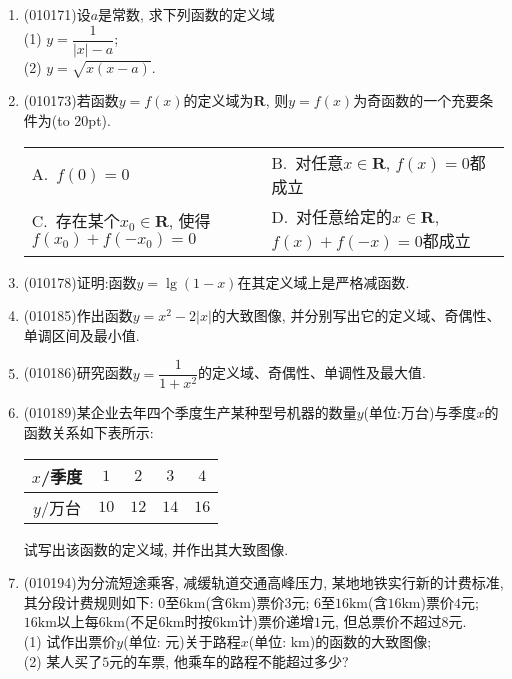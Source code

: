 \documentclass[10pt,a4paper]{article}
\newcommand{\bracket}[1]{(\hbox to #1pt{})}
\newcommand{\twoch}[4]{\par\begin{tabular}{p{.46\textwidth}p{.46\textwidth}}
A.~#1& B.~#2\\
C.~#3& D.~#4
\end{tabular}}
\begin{document}
\begin{enumerate}[1.]
\begin{center}
\end{center}
\item {\tiny (010171)}设$a$是常数, 求下列函数的定义域\\
(1) $y=\dfrac1{|x|-a}$;\\
(2) $y=\sqrt{x(x-a)}$.
\item {\tiny (010173)}若函数$y=f(x)$的定义域为$\mathbf{R}$, 则$y=f(x)$为奇函数的一个充要条件为\bracket{20}.
\twoch{$f(0)=0$}{对任意$x\in \mathbf{R}$, $f(x)=0$都成立}{存在某个$x_0\in \mathbf{R}$, 使得$f(x_0)+f(-x_0)=0$}{对任意给定的$x\in \mathbf{R}$, $f(x)+f(-x)=0$都成立}
\item {\tiny (010178)}证明:函数$y=\lg (1-x)$在其定义域上是严格减函数.
\item {\tiny (010185)}作出函数$y=x^2-2|x|$的大致图像, 并分别写出它的定义域、奇偶性、单调区间及最小值.
\item {\tiny (010186)}研究函数$y=\dfrac1{1+x^2}$的定义域、奇偶性、单调性及最大值.
\item {\tiny (010189)}某企业去年四个季度生产某种型号机器的数量$y$(单位:万台)与季度$x$的函数关系如下表所示:
\begin{center}
\begin{tabular}{|c|c|c|c|c|}
\hline
$x$/季度 & $1$ & $2$ & $3$ & $4$ \\ \hline
$y$/万台 & $10$ & $12$ & $14$ & $16$ \\ \hline
\end{tabular}
\end{center}
试写出该函数的定义域, 并作出其大致图像.
\item {\tiny (010194)}为分流短途乘客, 减缓轨道交通高峰压力, 某地地铁实行新的计费标准, 其分段计费规则如下: $0$至$6\text{km}$(含$6\text{km}$)票价$3$元; $6$至$16\text{km}$(含$16\text{km}$)票价$4$元; $16\text{km}$以上每$6\text{km}$(不足$6\text{km}$时按$6\text{km}$计)票价递增$1$元, 但总票价不超过$8$元.\\
(1) 试作出票价$y$(单位: 元)关于路程$x$(单位: $\text{km}$)的函数的大致图像;\\
(2) 某人买了$5$元的车票, 他乘车的路程不能超过多少?

\end{enumerate}
\end{document}

